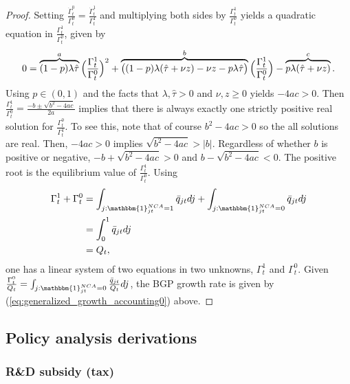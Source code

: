 \documentclass[11pt,english]{article}
\theoremstyle{definition}
\begin{document}
\begin{proof}
	Setting $\frac{\dot{\Gamma}_t^0}{\Gamma_t^0} = \frac{\dot{\Gamma}_t^1}{\Gamma_t^1}$ and multiplying both sides by $\frac{\Gamma_t^1}{\Gamma_t^0}$ yields a quadratic equation in $\frac{ \Gamma_t^1}{\Gamma_t^0}$, given by
	\begin{align}
		0 = \overbrace{(1-p) \lambda \hat{\tau}}^{\mathclap{a}}\Big( \frac{\Gamma_t^1}{\Gamma_t^0}\Big)^2 + \overbrace{\big( (1-p) \lambda (\hat{\tau} + \nu z) - \nu z - p\lambda \hat{\tau} \big)}^{\mathclap{b}} \Big( \frac{\Gamma_t^1}{\Gamma_t^0}\Big) - \overbrace{p\lambda (\hat{\tau} + \nu z)}^{\mathclap{c}}.
	\end{align}
	Using $p \in (0,1)$ and the facts that $\lambda, \hat{\tau} > 0$ and $\nu, z \ge 0$ yields $-4ac > 0$. Then $\frac{\Gamma_t^1}{\Gamma_t^0} = \frac{-b \pm \sqrt{b^2 - 4ac}}{2a}$ implies that there is always exactly one strictly positive real solution for $\frac{\Gamma^0_t}{\Gamma^1_t}$. To see this, note that of course $b^2 - 4ac > 0$ so the all solutions are real. Then, $-4ac > 0$ implies $\sqrt{b^2 - 4ac} > |b|$. Regardless of whether $b$ is positive or negative, $-b + \sqrt{b^2 - 4ac} > 0$ and $b - \sqrt{b^2 - 4ac} < 0$. The positive root is the equilibrium value of $\frac{\Gamma_t^1}{\Gamma_t^0}$. Using
	\begin{align}
		\Gamma_t^1 + \Gamma_t^0 &= \int_{j : \mathbbm{1}^{NCA}_{jt} = 1} \bar{q}_{jt} dj + \int_{j : \mathbbm{1}^{NCA}_{jt} = 0} \bar{q}_{jt} dj \nonumber \\
		                        &= \int_0^1 \bar{q}_{jt} dj \nonumber  \\
		                        &= Q_t,
	\end{align}
	one has a linear system of two equations in two unknowns, $\Gamma_t^1$ and $\Gamma_t^0$. Given $\frac{\Gamma_t^0}{Q_t} = \int_{j : \mathbbm{1}^{NCA}_{jt} = 0} \frac{\bar{q}_{jt}}{Q_t} dj$, the BGP growth rate is given by (\ref{eq:generalized_growth_accounting0}) above.   
\end{proof}




\subsection{Policy analysis derivations}

\subsubsection{R\&D subsidy (tax)}\label{appendix:model:efficiencyderivations:RDsubsidy}
\end{document}
